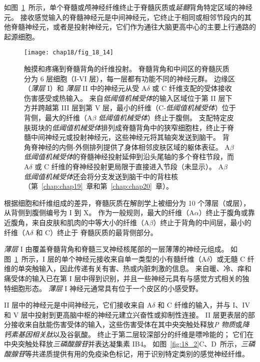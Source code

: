 如图~\ref{fig:18_14}~所示，单个脊髓或颅神经纤维终止于脊髓灰质或\textit{延髓}背角特定区域的神经元。
接收感觉输入的脊髓神经元是中间神经元，它终止于相同或相邻节段内的其他脊髓神经元，或者是投射神经元，它们作为通往大脑更高中心的主要上行通路的起源细胞。


\begin{figure}[htbp]
	\centering
	\texttt{[image: chap18/fig\_18\_14]}
	\caption{触摸和疼痛到脊髓背角的纤维投射。
		脊髓背角和中间区的脊髓灰质分为 6 层细胞（I-VI 层），每一层都有功能不同的神经元群。
		边缘区（\textit{薄层} I）和 \textit{薄层} II 中的神经元从受 A$\delta$ 或 C 纤维支配的受体接收伤害感受或热输入。 
		来自\textit{低阈值机械受体}的输入区域位于第 II 层下方并跨越第 III 层到第 V 层，最小的纤维（C-\textit{低阈值机械受体}）位于背侧，最大的纤维（A$\beta$ \textit{低阈值机械受体}）终止于腹侧。
		支配特定皮肤斑块的\textit{低阈值机械受体}排列成脊髓背角中的狭窄细胞柱，终止于脊髓中间神经元或投射神经元，这些神经元将其轴突发送到脑干。
		背角脊神经的内侧-外侧排列提供了身体相邻皮肤区域的躯体表征。
		A$\beta$ \textit{低阈值机械受体}的脊髓神经投射延伸到沿头尾轴的多个脊柱节段，而 A$\delta$ 或 C 纤维的脊神经投射更局限于直接进入节段（未显示）。
		A$\beta$ \textit{低阈值机械受体}还会将分支发送到脑干中的背柱核（第~\ref{chap:chap19}~章和第~\ref{chap:chap20}~章）。}
	\label{fig:18_14}
\end{figure}


根据细胞和纤维组成的差异，脊髓灰质在解剖学上被细分为 10 个薄层（或层），从背侧到腹侧编号为 I 到 X。
作为一般规则，最大的纤维（A$\alpha$）终止于腹角或靠近腹角，来自皮肤和肌肉的中等大小的纤维（A$\beta$）终止于背角的中间层，最小的纤维（A$\delta$ 和 C）终止于 脊髓灰质的最背侧部分。


\textit{薄层} I 由覆盖脊髓背角和脊髓三叉神经核尾部的一层薄薄的神经元组成。
如图~\ref{fig:18_14}~所示，I 层的单个神经元接收来自单一类型的小有髓纤维（A$\delta$）或无髓 C 纤维的单突触输入，因此传递有关有害、热或内脏刺激的信息。
来自暖、冷、痒和痛受体的输入已在第 I 层中得到识别，并且一些神经元具有与感觉方式相关的独特细胞形态。
\textit{薄层} I 神经元通常具有位于一个皮区的小感受野。


II 层中的神经元是中间神经元，它们接收来自 A$\delta$ 和 C 纤维的输入，并与 I、IV 和 V 层中投射到更高脑中枢的神经元建立兴奋性或抑制性连接。
II 层更表层的部分接收来自肽能伤害受体的输入，这些伤害受体在其中央突触处释放\textit{P 物质}或\textit{降钙素基因相关肽}以及谷氨酸。
终止于第二层较深部分的纤维是嘌呤能的；
它们在中央突触处释放\textit{三磷酸腺苷}并表达凝集素 IB4。
如图~\ref{fig:18_2}C、D~所示，\textit{三磷酸腺苷}等共递质提供有用的免疫染色标记，用于识别特定类别的感觉神经纤维。


